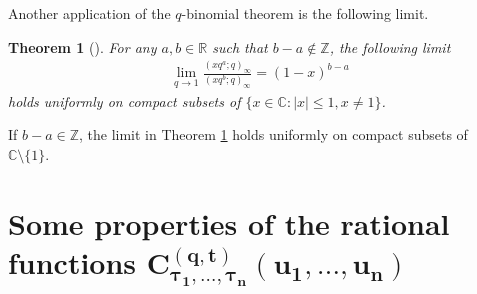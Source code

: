 \documentclass[pdftex]{sigma}
\numberwithin{equation}{section}
\newtheorem{thm}{Theorem}[section]
\newcommand{\C}{\mathbb{C}}
\newcommand{\R}{\mathbb{R}}
\newcommand{\Z}{\mathbb{Z}}
\begin{document}
Another application of the $q$-binomial theorem is the following limit.

\begin{thm}[{\cite[Theorem~10.2.4]{AAR}}]\label{qtheory3}
For any $a, b \in\R$ such that $b-a\notin\Z$, the following limit
\begin{gather*}
\lim_{q\rightarrow 1}{\frac{(xq^a; q)_{\infty}}{(xq^b; q)_{\infty}}} = (1 - x)^{b-a}
\end{gather*}
holds uniformly on compact subsets of $\{x\in\C \colon |x|\leq 1, x\neq 1\}$.
\end{thm}

\begin{rem}
If $b - a\in\Z$, the limit in Theorem {\rm \ref{qtheory3}} holds uniformly on compact subsets of~$\C\setminus\{1\}$.
\end{rem}

\section[Some properties of the rational functions $C^{(q, t)}_{\tau_1, \dots, \tau_n}(u_1, \dots, u_n)$]{Some properties of the rational functions $\boldsymbol{C^{(q, t)}_{\tau_1, \dots, \tau_n}(u_1, \dots, u_n)}$}\label{app:cfunctions}
\end{document}
